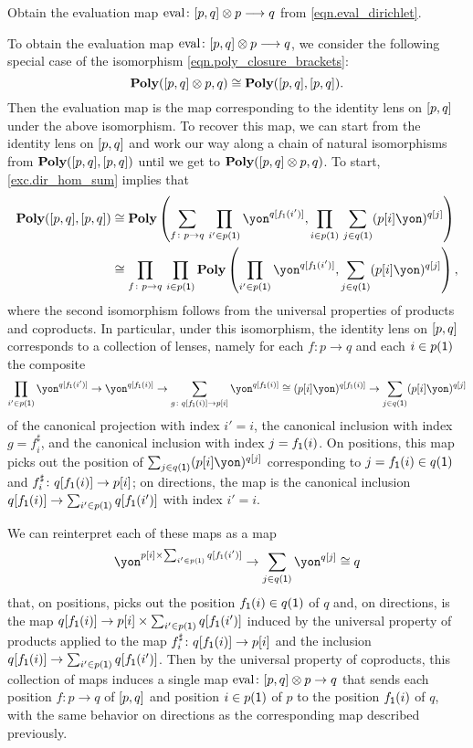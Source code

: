\documentclass[Book-Poly]{subfiles}
\begin{document}
\begin{exercise} \label{exc.eval_dirichlet}
Obtain the evaluation map $\mathrm{eval}\colon [p,q]\otimes p\longrightarrow q$ from \eqref{eqn.eval_dirichlet}.
\begin{solution}
To obtain the evaluation map $\mathrm{eval}\colon [p,q]\otimes p\longrightarrow q$, we consider the following special case of the isomorphism \eqref{eqn.poly_closure_brackets}:
\[
    \mathbf{Poly}([p,q] \otimes p, q) \cong \mathbf{Poly}([p,q], [p,q]).
\]
Then the evaluation map is the map corresponding to the identity lens on $[p,q]$ under the above isomorphism.
To recover this map, we can start from the identity lens on $[p,q]$ and work our way along a chain of natural isomorphisms from $\mathbf{Poly}([p,q], [p,q])$ until we get to $\mathbf{Poly}([p,q] \otimes p, q)$.
To start, \cref{exc.dir_hom_sum} implies that
\begin{align*}
    \poly(\ihom{p,q}, \ihom{p,q})
    &\iso
    \poly\left(\sum_{f \colon p \to q} \, \prod_{i' \in p(\1)} \yon^{q[f_\1(i')]}, \prod_{i \in p(\1)} \, \sum_{j \in q(\1)} (p[i]\yon)^{q[j]}\right) \\
    &\iso
    \prod_{f \colon p \to q} \, \prod_{i \in p(\1)} \poly\left(\prod_{i' \in p(\1)} \yon^{q[f_\1(i')]}, \sum_{j \in q(\1)} (p[i]\yon)^{q[j]}\right),
\end{align*}
where the second isomorphism follows from the universal properties of products and coproducts.
In particular, under this isomorphism, the identity lens on $[p,q]$ corresponds to a collection of lenses, namely for each $f \colon p \to q$ and each $i \in p(\textsf{1})$ the composite
\[
    \prod_{i' \in p(\1)} \yon^{q[f_\1(i')]} \to \yon^{q[f_\1(i)]} \to \sum_{g \colon q[f_\1(i)] \to p[i]} \yon^{q[f_\1(i)]} \iso (p[i]\yon)^{q[f_\1(i)]} \to \sum_{j \in q(\1)} (p[i]\yon)^{q[j]}
\]
of the canonical projection with index $i' = i$, the canonical inclusion with index $g = f^\sharp_i$, and the canonical inclusion with index $j = f_{\textsf{1}}(i)$.
On positions, this map picks out the position of $\sum_{j \in q(\1)} (p[i]\yon)^{q[j]}$ corresponding to $j = f_{\textsf{1}}(i) \in q(\textsf{1})$ and $f^\sharp_i \colon q[f_{\textsf{1}}(i)] \to p[i]$; on directions, the map is the canonical inclusion $q[f_{\textsf{1}}(i)] \to \sum_{i' \in p(\textsf{1})} q[f_{\textsf{1}}(i')]$ with index $i' = i$.

We can reinterpret each of these maps as a map
\[
    \yon^{p[i] \times \sum_{i' \in p(\1)} q[f_\1(i')]} \to \sum_{j \in q(\1)} \yon^{q[j]} \iso q
\]
that, on positions, picks out the position $f_{\textsf{1}}(i) \in q(\textsf{1})$ of $q$ and, on directions, is the map $q[f_{\textsf{1}}(i)] \to p[i] \times \sum_{i' \in p(\textsf{1})} q[f_{\textsf{1}}(i')]$ induced by the universal property of products applied to the map $f^\sharp_i \colon q[f_{\textsf{1}}(i)] \to p[i]$ and the inclusion $q[f_{\textsf{1}}(i)] \to \sum_{i' \in p(\textsf{1})} q[f_{\textsf{1}}(i')]$.
Then by the universal property of coproducts, this collection of maps induces a single map $\mathrm{eval} \colon [p, q] \otimes p \to q$ that sends each position $f \colon p \to q$ of $[p,q]$ and position $i \in p(\textsf{1})$ of $p$ to the position $f_{\textsf{1}}(i)$ of $q$, with the same behavior on directions as the corresponding map described previously.
\end{solution}
\end{exercise}
\end{document}
